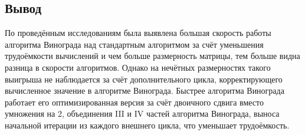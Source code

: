 \subsection*{Вывод}

\hspace{1.25cm}
По проведённым исследованиям была выявлена большая скорость работы алгоритма Винограда над стандартным алгоритмом за счёт уменьшения трудоёмкости вычислений и чем больше размерность матрицы, тем больше видна разница в скорости алгоритмов. Однако на нечётных размерностях такого выигрыша не наблюдается за счёт дополнительного цикла, корректирующего вычисленное значение в алгоритме Винограда. Быстрее алгоритма Винограда работает его оптимизированная версия за счёт двоичного сдвига вместо умножения на 2, объединения III и IV частей алгоритма Винограда, выноса начальной итерации из каждого внешнего цикла, что уменьшает трудоёмкость.

\newpage
